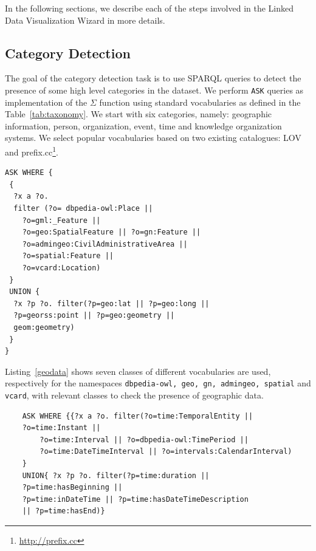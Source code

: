 In the following sections, we describe each of the steps involved in the Linked Data Visualization Wizard in more details. 

\subsection{Category Detection}
The goal of the category detection task is to use SPARQL queries to detect the presence of some high level categories in the dataset. We perform \texttt{ASK} queries as implementation of the $\Sigma $ function using standard vocabularies as defined in the Table~\ref{tab:taxonomy}. We start with six categories, namely: geographic information, person, organization, event, time and knowledge organization systems. We select popular vocabularies based on two existing catalogues: LOV~\cite{pyv2012} and prefix.cc\footnote{\url{http://prefix.cc}}.

\begin{lstlisting}
ASK WHERE {
 {
  ?x a ?o.
  filter (?o= dbpedia-owl:Place ||
    ?o=gml:_Feature || 
    ?o=geo:SpatialFeature || ?o=gn:Feature ||
    ?o=admingeo:CivilAdministrativeArea ||
    ?o=spatial:Feature ||
    ?o=vcard:Location)
 }
 UNION {
  ?x ?p ?o. filter(?p=geo:lat || ?p=geo:long ||
  ?p=georss:point || ?p=geo:geometry || 
  geom:geometry)
 }
}
\end{lstlisting}

 Listing~\ref{geodata} shows seven classes of different vocabularies are used, respectively for the namespaces \texttt{dbpedia-owl, geo, gn, admingeo, spatial} and \texttt{vcard}, with relevant classes to check the presence of geographic data.

\begin{lstlisting} 
	ASK WHERE {{?x a ?o. filter(?o=time:TemporalEntity || 
	?o=time:Instant || 
		?o=time:Interval || ?o=dbpedia-owl:TimePeriod || 
		?o=time:DateTimeInterval || ?o=intervals:CalendarInterval)
	} 
	UNION{ ?x ?p ?o. filter(?p=time:duration || 
	?p=time:hasBeginning || 
	?p=time:inDateTime || ?p=time:hasDateTimeDescription 
	|| ?p=time:hasEnd)}

\end{lstlisting}


